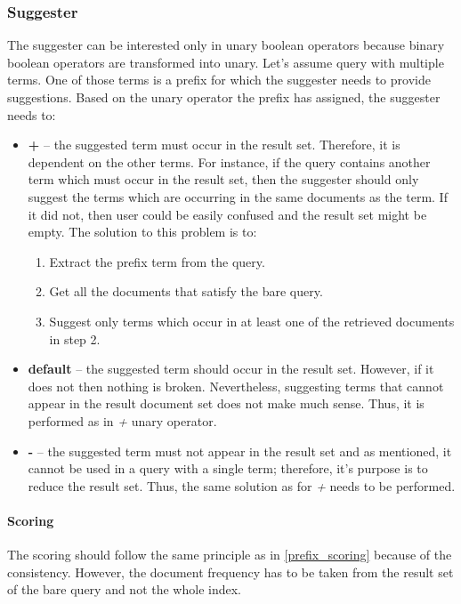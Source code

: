 \subsubsection{Suggester}
The suggester can be interested only in unary boolean operators because binary boolean operators are transformed into unary.
Let's assume query with multiple terms. One of those terms is a prefix for which the suggester needs to provide suggestions.
Based on the unary operator the prefix has assigned, the suggester needs to:
\begin{itemize}
    \item \textbf{+} – the suggested term must occur in the result set. Therefore, it is dependent on the other terms.
    For instance, if the query contains another term which must occur in the result set, then the suggester should only
    suggest the terms which are occurring in the same documents as the term. If it did not, then user could be easily
    confused and the result set might be empty. The solution to this problem is to:
    \begin{enumerate}
        \item Extract the prefix term from the query.
        \item Get all the documents that satisfy the bare query.
        \item Suggest only terms which occur in at least one of the retrieved documents in step 2.
    \end{enumerate}
    \item \textbf{default} – the suggested term should occur in the result set. However, if it does not then nothing is broken.
    Nevertheless, suggesting terms that cannot appear in the result document set does not make much sense. Thus, it is performed
    as in \textit{+} unary operator.
    \item \textbf{-} – the suggested term must not appear in the result set and as mentioned, it cannot be used in a
    query with a single term; therefore, it's purpose is to reduce the result set. Thus, the same solution as for \textit{+}
    needs to be performed.
\end{itemize}

\paragraph{Scoring}
The scoring should follow the same principle as in \ref{prefix_scoring} because of the consistency. However,
the document frequency has to be taken from the result set of the bare query and not the whole index.

